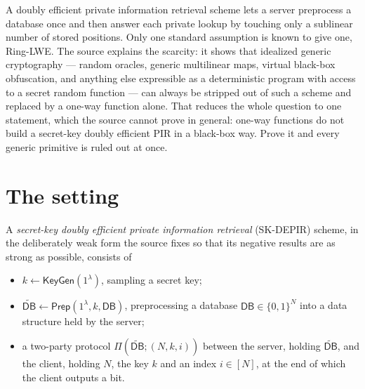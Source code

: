 \documentclass{aicr-conjecture}
\newcommand{\bits}{\{0,1\}}
\newcommand{\DB}{\mathsf{DB}}
\newcommand{\pDB}{\widetilde{\mathsf{DB}}}
\newcommand{\KeyGen}{\mathsf{KeyGen}}
\newcommand{\Prep}{\mathsf{Prep}}
\begin{document}

\vspace{0.4em}

\begin{informalconjecture}
A doubly efficient private information retrieval scheme lets a server
preprocess a database once and then answer each private lookup by
touching only a sublinear number of stored positions. Only one standard
assumption is known to give one, Ring-LWE\@. The source explains the
scarcity: it shows that idealized generic cryptography --- random
oracles, generic multilinear maps, virtual black-box obfuscation, and
anything else expressible as a deterministic program with access to a
secret random function --- can always be stripped out of such a scheme
and replaced by a one-way function alone. That reduces the whole question
to one statement, which the source cannot prove in general: one-way
functions do not build a secret-key doubly efficient PIR in a black-box
way. Prove it and every generic primitive is ruled out at once.
\end{informalconjecture}

\section{The setting}\label{sec:setting}

A \emph{secret-key doubly efficient private information retrieval}
(SK-DEPIR) scheme, in the deliberately weak form the source fixes so that
its negative results are as strong as possible, consists of

\begin{itemize}[nosep]
  \item $k \leftarrow \KeyGen(1^{\lambda})$, sampling a secret key;
  \item $\pDB \leftarrow \Prep(1^{\lambda}, k, \DB)$, preprocessing a
    database $\DB \in \bits^{N}$ into a data structure held by the
    server;
  \item a two-party protocol $\Pi(\pDB; (N,k,i))$ between the server,
    holding $\pDB$, and the client, holding $N$, the key $k$ and an index
    $i \in [N]$, at the end of which the client outputs a bit.
\end{itemize}
\end{document}
